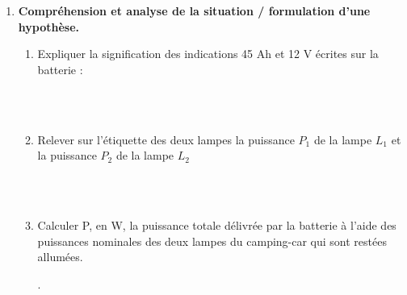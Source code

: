 \documentclass[11pt]{article}
\newcommand\SA{\marginpar{\scalebox{.8}{\framebox[1.6ex]{\rule{0ex}{1.6ex}\raisebox{.75ex}{\rule{1.6ex}{.5pt}}}\hspace{-.3pt}\framebox[3.2ex]{S}}}}
\newcommand\R{\marginpar{\scalebox{.8}{\framebox[1.6ex]{\rule{0ex}{1.6ex}\raisebox{.75ex}{\rule{1.6ex}{.5pt}}}\hspace{-.3pt}\framebox[3.2ex]{R}}}}
\newcommand\C{\marginpar{\scalebox{.8}{\framebox[1.6ex]{\rule{0ex}{1.6ex}\raisebox{.75ex}{\rule{1.6ex}{.5pt}}}\hspace{-.3pt}\framebox[3.2ex]{C}}}}
\begin{document}
 \begin{enumerate}
\item \textbf{Compréhension et analyse de la situation / formulation d'une hypothèse.}\\

\begin{enumerate}

\item Expliquer la signification des indications 45 Ah et 12 V écrites sur la batterie :

\begin{minipage}[c]{.91\linewidth}

\vspace{8mm}

    \dotfill\\

    \dotfill \\ 
    
  \end{minipage}\SA \C
\vspace{3mm}


\item Relever sur l'étiquette des deux lampes la puissance $P_1$ de la lampe $L_1$ et la puissance $P_2$ de la lampe $L_2$


\begin{minipage}[c]{.91\linewidth}

\vspace{8mm}

    \dotfill\\

    \dotfill \\ 
    
  \end{minipage}\SA
\vspace{3mm}

\item Calculer P, en W, la puissance totale délivrée par la batterie à l'aide des puissances nominales des deux lampes du camping-car qui sont restées allumées.  \\[5mm]
\begin{minipage}[c]{.91\linewidth}

    \vspace{8mm}
    
    .\dotfill\\
    
  \end{minipage}\R


\vfill 


\newpage




\end{enumerate}
\end{enumerate}
\end{document}
